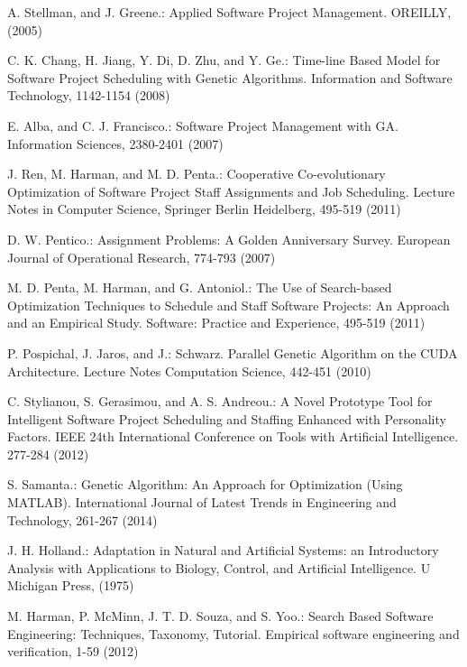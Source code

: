 %
%
\clearpage

\begin{thebibliography}{}
%
A. Stellman, and J. Greene.:
Applied Software Project Management.
OREILLY, (2005)

C. K. Chang, H. Jiang, Y. Di, D. Zhu, and Y. Ge.:
Time-line Based Model for Software Project 
Scheduling with Genetic Algorithms.
Information and Software Technology, 1142-1154 (2008)

E. Alba, and C. J. Francisco.:
Software Project Management with GA.
Information Sciences, 2380-2401 (2007)

J. Ren, M. Harman, and M. D. Penta.:
Cooperative Co-evolutionary Optimization of Software 
Project Staff Assignments and Job Scheduling.
Lecture Notes in Computer Science, Springer Berlin Heidelberg, 495-519 (2011)

D. W. Pentico.:
Assignment Problems: A Golden Anniversary Survey.
European Journal of Operational Research, 774-793 (2007)

M. D. Penta, M. Harman, and G. Antoniol.:
The Use of Search-based Optimization Techniques to 
Schedule and Staff Software Projects: An Approach and an Empirical Study. 
Software: Practice and Experience, 495-519 (2011)

P. Pospichal, J. Jaros, and J.:
Schwarz. Parallel Genetic Algorithm on the CUDA Architecture.
Lecture Notes Computation Science, 442-451 (2010)


C. Stylianou, S. Gerasimou, and A. S. Andreou.:
A Novel Prototype Tool for Intelligent Software 
Project Scheduling and Staffing Enhanced with Personality Factors.
IEEE 24th International Conference on Tools with Artificial Intelligence. 277-284 (2012)

S. Samanta.:
Genetic Algorithm: An Approach for Optimization (Using MATLAB). 
International Journal of Latest Trends in Engineering and Technology, 261-267 (2014)

J. H. Holland.:
Adaptation in Natural and Artificial Systems: an Introductory 
Analysis with Applications to Biology, Control, and Artificial Intelligence.
U Michigan Press, (1975)

M. Harman, P. McMinn, J. T. D. Souza, and S. Yoo.:
Search Based Software Engineering: Techniques, Taxonomy, Tutorial.
Empirical software engineering and verification, 1-59 (2012)


\end{thebibliography}
